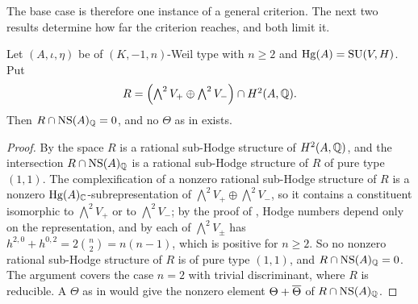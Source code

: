 The base case is therefore one instance of a general criterion. The next two
results determine how far the criterion reaches, and both limit it.

\begin{proposition}\label{prop:divfails}
Let $(A,\iota,\eta)$ be of $(K,-1,n)$-Weil type with $n\ge2$ and
$\operatorname{Hg}(A)=\operatorname{SU}(V,H)$. Put
\[
  R=\Bigl(\textstyle\bigwedge^{2}V_{+}\oplus\bigwedge^{2}V_{-}\Bigr)
      \cap H^{2}(A,\mathbb{Q}).
\]
Then $R\cap\mathrm{NS}(A)_{\mathbb{Q}}=0$, and no $\Theta$ as in 
exists.
\end{proposition}

\begin{proof}
By  the space $R$ is a rational sub-Hodge structure of
$H^{2}(A,\mathbb{Q})$, and the intersection $R\cap\mathrm{NS}(A)_{\mathbb{Q}}$ is a rational
sub-Hodge structure of $R$ of pure type $(1,1)$. The complexification of a
nonzero rational sub-Hodge structure of $R$ is a nonzero
$\operatorname{Hg}(A)_{\mathbb{C}}$-subrepresentation of $\bigwedge^{2}V_{+}\oplus\bigwedge^{2}V_{-}$,
so it contains a constituent isomorphic to $\bigwedge^{2}V_{+}$ or to
$\bigwedge^{2}V_{-}$; by the proof of , Hodge numbers
depend only on the representation, and by  each of
$\bigwedge^{2}V_{\pm}$ has $h^{2,0}+h^{0,2}=2\binom{n}{2}=n(n-1)$, which is
positive for $n\ge2$. So no nonzero rational sub-Hodge structure of $R$ is of
pure type $(1,1)$, and $R\cap\mathrm{NS}(A)_{\mathbb{Q}}=0$. The argument covers the case
$n=2$ with trivial discriminant, where $R$ is reducible. A $\Theta$ as in
 would give the nonzero element $\Theta+\overline{\Theta}$
of $R\cap\mathrm{NS}(A)_{\mathbb{Q}}$.
\end{proof}

